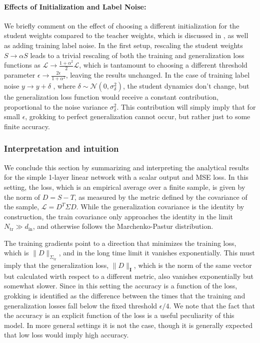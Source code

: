 \documentclass[a4paper,11pt]{article}
\newcommand{\loss}{\mathcal{L}}
\newcommand{\norm}[1]{\| #1 \|}
\newcommand{\din}{d_\mathrm{in}}
\newcommand{\training}{\mathrm{tr}}
\begin{document}
\paragraph{Effects of Initialization and Label Noise:}
We briefly comment on the effect of choosing a different initialization for the student weights compared to the teacher weights, which is discussed in \cite{liu2023omnigrok}, as well as adding training label noise. In the first setup, rescaling the student weights $S \to \alpha S$ leads to a trivial rescaling of both the training and generalization loss functions as $\mathcal{L}\to \frac{1+\alpha^2}{2} \mathcal{L}$, which is tantamount to choosing a different threshold parameter $\epsilon \to \frac{2\epsilon}{1+\alpha^2}$, leaving the results unchanged.
In the case of training label noise $y\to y + \delta$ , where
$\delta \sim \mathcal{N}(0,\sigma_\delta^2)$, the student dynamics don't change, but the generalization loss function would receive a constant contribution, proportional to the noise variance $\sigma^2_\delta$. This contribution will simply imply that for small $\epsilon$, grokking to perfect generalization cannot occur, but rather just to some finite accuracy.

\subsubsection{Interpretation and intuition}
We conclude this section by summarizing and interpreting the analytical results for the simple 1-layer linear network with a scalar output and MSE loss. In this setting, the loss, which is an empirical average over a finite sample, is given by the norm of $D=S-T$, as measured by the metric defined by the covariance of the sample, $\loss = D^T\Sigma D$. While the generalization covariance is the identity by construction, the train covariance only approaches the identity in the limit $N_\training\gg \din$, and otherwise follows the Marchenko-Pastur distribution. 

The training gradients point to a direction that minimizes the training loss, which is $\norm{D}_{\Sigma_\training}$, and in the long time limit it vanishes exponentially. This must imply that the generalization loss, $\norm{D}_{\bm I}$, which is the norm of the same vector but calculated wirth respect to a different metric, also vanishes exponentially but somewhat slower. Since in this setting the accuracy is a function of the loss, grokking is identified as the difference between the times that the training and generalization losses fall below the fixed threshold $\epsilon/4$. We note that the fact that the accuracy is an explicit function of the loss is a useful peculiarity of this model. In more general settings it is not the case, though it is generally expected that low loss would imply high accuracy. 
\end{document}
